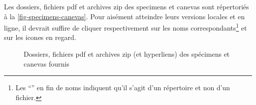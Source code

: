 Les dossiers, fichiers \acrshort{pdf} et archives \gls{zip} des specimens et
canevas sont répertoriés à la \vref{fig-specimens-canevas}. Pour aisément
atteindre leurs versions locales et en ligne, il devrait suffire de cliquer
respectivement sur les noms correspondants\footnote{Les \enquote{\directory{/}}
  en fin de noms indiquent qu'il s'agit d'un répertoire et non d'un fichier.} et
sur les icones \faExternalLink{} en regard.

\begin{figure}[ht]
  \centering
  
  \caption{Dossiers, fichiers \acrshort{pdf} et archives \gls{zip} (et
    hyperliens) des spécimens et canevas fournis}
  \label{fig-specimens-canevas}
\end{figure}


\begin{comment}
  \begin{table}[ht]
    \centering
    
    \caption{(Liens vers les )Dossiers, fichiers \acrshort{pdf} et archives \textsc{zip} des
      spécimens et canevas fournis
      avec la \yatcl{}}
    \label{tab-specimens-canevas}
  \end{table}
\end{comment}

%
\begin{comment}
  \begin{itemize}
  \item pour la distribution \TeX{} Live\versiontl, sur les systèmes :
    \begin{itemize}
    \item Linux et Mac OS X :
      \href{./.}{\directory{\unixtldirectory\tldistdirectory\jobdocdirectory/}} ;
    \item Windows :
      \href{./.}{\directory{\wintldirectory\tldistdirectory\jobdocdirectory/}} ;
    \end{itemize}
  \item pour la distribution MiK\TeX{} : \directory{\miktexdistdirectory}.
  \end{itemize}
\end{comment}

